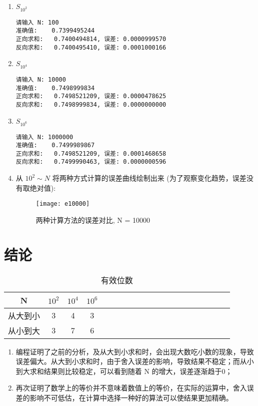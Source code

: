 \begin{enumerate}
    \item $S_{10^2}$

    \begin{lstlisting}[style = cpp]
请输入 N: 100
准确值:	0.7399495244
正向求和:	0.7400494814, 误差: 0.0000999570
反向求和:	0.7400495410, 误差: 0.0001000166
    \end{lstlisting}

    \item $S_{10^4}$

    \begin{lstlisting}[style = cpp]
请输入 N: 10000
准确值:	0.7498999834
正向求和:	0.7498521209, 误差: 0.0000478625
反向求和:	0.7498999834, 误差: 0.0000000000
    \end{lstlisting}

    \item $S_{10^6}$

    \begin{lstlisting}[style = cpp]
请输入 N: 1000000
准确值:	0.7499989867
正向求和:	0.7498521209, 误差: 0.0001468658
反向求和:	0.7499990463, 误差: 0.0000000596
    \end{lstlisting}

    \item 从 $10^2 \sim N$ 将两种方式计算的误差曲线绘制出来 (为了观察变化趋势，误差没有取绝对值):

    \begin{figure}[ht]
    \centering
        \texttt{[image: e10000]}
        \caption{两种计算方法的误差对比, N = 10000}
        \label{fig:e10000}
    \end{figure}

\end{enumerate}

\section{结论}

\begin{table}[ht]
  \centering
  \caption{有效位数}
  \label{tab:1}
  \begin{tabular}{*{20}c}
     \hline
     N & $10^2$ & $10^4$ & $10^6$ \\
     \hline
     从大到小 & 3  & 4  & 3 \\
     从小到大 & 3  & 7  & 6 \\
     \hline
   \end{tabular}
\end{table}

\begin{enumerate}
    \item 编程证明了之前的分析，及从大到小求和时，会出现大数吃小数的现象，导致误差偏大。从大到小求和时，由于舍入误差的影响，导致结果不稳定；而从小到大求和结果则比较稳定，可以看到随着 N 的增大，误差逐渐趋于0；

    \item 再次证明了数学上的等价并不意味着数值上的等价，在实际的运算中，舍入误差的影响不可低估，在计算中选择一种好的算法可以使结果更加精确。
\end{enumerate}



